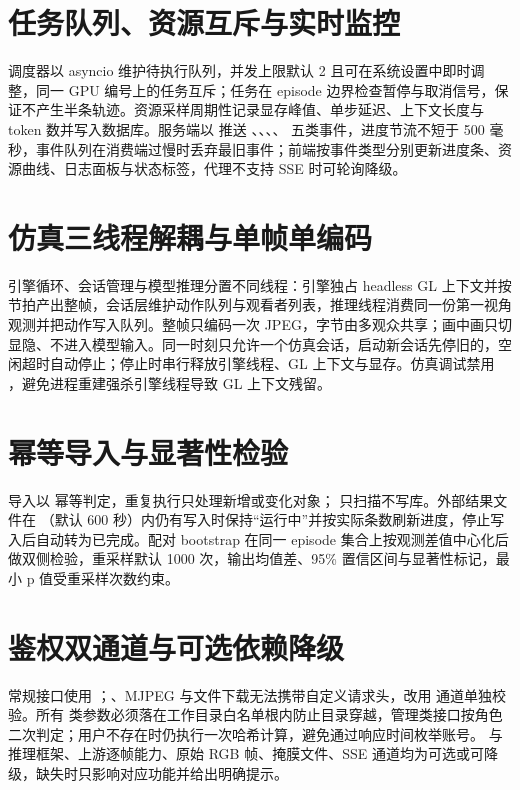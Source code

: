 \section{任务队列、资源互斥与实时监控}

调度器以 asyncio 维护待执行队列，并发上限默认 2 且可在系统设置中即时调整，同一 GPU 编号上的任务互斥；任务在 episode 边界检查暂停与取消信号，保证不产生半条轨迹。资源采样周期性记录显存峰值、单步延迟、上下文长度与 token 数并写入数据库。服务端以  推送 、、、、 五类事件，进度节流不短于 500 毫秒，事件队列在消费端过慢时丢弃最旧事件；前端按事件类型分别更新进度条、资源曲线、日志面板与状态标签，代理不支持 SSE 时可轮询降级。

\section{仿真三线程解耦与单帧单编码}

引擎循环、会话管理与模型推理分置不同线程：引擎独占 headless GL 上下文并按节拍产出整帧，会话层维护动作队列与观看者列表，推理线程消费同一份第一视角观测并把动作写入队列。整帧只编码一次 JPEG，字节由多观众共享；画中画只切显隐、不进入模型输入。同一时刻只允许一个仿真会话，启动新会话先停旧的，空闲超时自动停止；停止时串行释放引擎线程、GL 上下文与显存。仿真调试禁用 ，避免进程重建强杀引擎线程导致 GL 上下文残留。

\section{幂等导入与显著性检验}

导入以  幂等判定，重复执行只处理新增或变化对象； 只扫描不写库。外部结果文件在 （默认 600 秒）内仍有写入时保持“运行中”并按实际条数刷新进度，停止写入后自动转为已完成。配对 bootstrap 在同一 episode 集合上按观测差值中心化后做双侧检验，重采样默认 1000 次，输出均值差、95\% 置信区间与显著性标记，最小 p 值受重采样次数约束。

\section{鉴权双通道与可选依赖降级}

常规接口使用 ；、MJPEG 与文件下载无法携带自定义请求头，改用  通道单独校验。所有  类参数必须落在工作目录白名单根内防止目录穿越，管理类接口按角色二次判定；用户不存在时仍执行一次哈希计算，避免通过响应时间枚举账号。 与推理框架、上游逐帧能力、原始 RGB 帧、掩膜文件、SSE 通道均为可选或可降级，缺失时只影响对应功能并给出明确提示。

